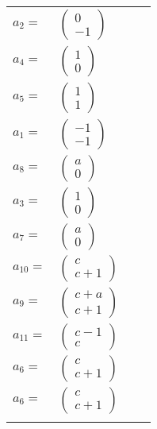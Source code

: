 \documentclass[1p]{elsarticle_modified}
\theoremstyle{definition}
\begin{document}
\begin{tabular}{m{7pt} m{180pt} m{7pt} m{180pt} }
\flushright $a_{2}=$&$\begin{pmatrix}0\\-1\end{pmatrix}$ \\
\flushright $a_{4}=$&$\begin{pmatrix}1\\0\end{pmatrix}$ \\
\flushright $a_{5}=$&$\begin{pmatrix}1\\1\end{pmatrix}$ \\
\flushright $a_{1}=$&$\begin{pmatrix}-1\\-1\end{pmatrix}$ \\
\flushright $a_{8}=$&$\begin{pmatrix}a\\0\end{pmatrix}$ \\
\flushright $a_{3}=$&$\begin{pmatrix}1\\0\end{pmatrix}$ \\
\flushright $a_{7}=$&$\begin{pmatrix}a\\0\end{pmatrix}$ \\
\flushright $a_{10}=$&$\begin{pmatrix}c\\c+1\end{pmatrix}$ \\
\flushright $a_{9}=$&$\begin{pmatrix}c+a\\c+1\end{pmatrix}$ \\
\flushright $a_{11}=$&$\begin{pmatrix}c-1\\c\end{pmatrix}$ \\
\flushright $a_{6}=$&$\begin{pmatrix}c\\c+1\end{pmatrix}$\\ \flushright $a_{6}=$&$\begin{pmatrix}c\\c+1\end{pmatrix}$\\&\end{tabular}
\end{document}
